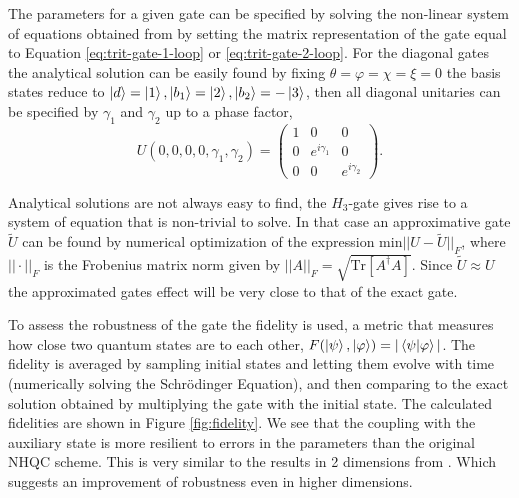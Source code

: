 The parameters for a given gate can be specified by solving the non-linear system of equations obtained from by setting the matrix representation of the gate equal to Equation \ref{eq:trit-gate-1-loop} or \ref{eq:trit-gate-2-loop}. For the diagonal gates the analytical solution can be easily found by fixing $\theta = \varphi = \chi = \xi = 0$ the basis states reduce to $\ket{d} = \ket{1}, \ket{b_1} = \ket{2}, \ket{b_2} = -\ket{3}$, then all diagonal unitaries can be specified by $\gamma_1$ and $\gamma_2$ up to a phase factor,
\begin{equation}
U(0,0,0,0,\gamma_1,\gamma_2) = \begin{pmatrix}
1&0&0
\\
0&e^{i\gamma_1}&0
\\
0&0&e^{i\gamma_2}
\end{pmatrix}.
\end{equation}

Analytical solutions are not always easy to find, the $H_3$-gate gives rise to a system of equation that is non-trivial to solve. In that case an approximative gate $\tilde{U}$ can be found by numerical optimization of the expression $\text{min}||U-\tilde{U}||_F$, where $||\cdot||_F$ is the Frobenius matrix norm given by $||A||_F = \sqrt{\text{Tr}\left[A^\dagger A \right]}$. Since $\tilde{U} \approx U$ the approximated gates effect will be very close to that of the exact gate.

To assess the robustness of the gate the fidelity is used, a metric that measures how close two quantum states are to each other, $F(\ket{\psi},\ket{\varphi}) = |\bra{\psi}\ket{\varphi}|$. The fidelity is averaged by sampling initial states and letting them evolve with time (numerically solving the Schrödinger Equation), and then comparing to the exact solution obtained by multiplying the gate with the initial state. The calculated fidelities are shown in Figure \ref{fig:fidelity}. We see that the coupling with the auxiliary state is more resilient to errors in the parameters than the original NHQC scheme. This is very similar to the results in 2 dimensions from \cite{darkpath}. Which suggests an improvement of robustness even in higher dimensions.

